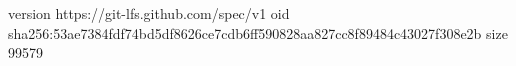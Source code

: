 version https://git-lfs.github.com/spec/v1
oid sha256:53ae7384fdf74bd5df8626ce7cdb6ff590828aa827cc8f89484c43027f308e2b
size 99579
